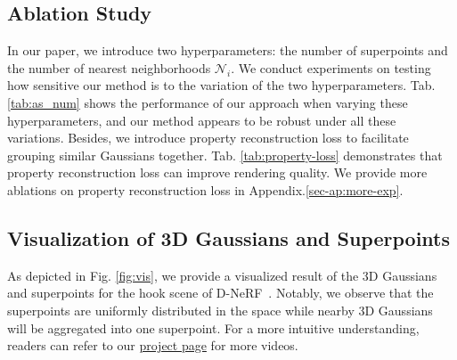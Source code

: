 \begin{table}[t]
    \centering
    \caption{Quantitative comparison on NeRF-DS~\cite{NeRF-DS}. The rendering size is $480 \times 270$.
    }
    \label{tab:NeRF-DS}
\end{table}


\subsection{Ablation Study}
In our paper, we introduce two hyperparameters: the number of superpoints and the number of nearest neighborhoods $\mathcal{N}_i$. We conduct experiments on testing how sensitive our method is to the variation of the two hyperparameters. 
Tab. \ref{tab:as_num} shows the performance of our approach when varying these hyperparameters, and our method appears to be robust under all these variations. 
Besides, we introduce property reconstruction loss to facilitate grouping similar Gaussians together. Tab. \ref{tab:property-loss} demonstrates that property reconstruction loss can improve rendering quality.
We provide more ablations on property reconstruction loss in Appendix.\ref{sec-ap:more-exp}.


\subsection{Visualization of 3D Gaussians and Superpoints}
As depicted in Fig. \ref{fig:vis}, we provide a visualized result of the 3D Gaussians and superpoints for the hook scene of D-NeRF~\cite{D-NeRF}. Notably, we observe that the superpoints are uniformly distributed in the space while nearby 3D Gaussians will be aggregated into one superpoint. 
For a more intuitive understanding, readers can refer to our \href{https://dnvtmf.github.io/SP_GS.github.io/}{project page} for more videos.


